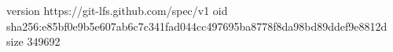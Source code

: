 version https://git-lfs.github.com/spec/v1
oid sha256:e85bf0e9b5e607ab6c7c341fad044cc497695ba8778f8da98bd89ddef9e8812d
size 349692
